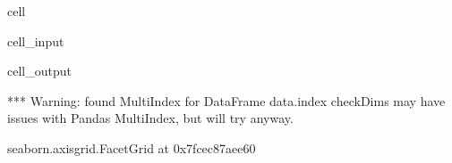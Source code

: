 \documentclass[letterpaper,table,10pt,english]{jupyterBook}
\begin{document}
\begin{sphinxuseclass}{cell}\begin{sphinxVerbatimInput}

\begin{sphinxuseclass}{cell_input}
\begin{sphinxVerbatim}[commandchars=\\\{\}]
  
     
                 
                     
\end{sphinxVerbatim}

\end{sphinxuseclass}\end{sphinxVerbatimInput}
\begin{sphinxVerbatimOutput}

\begin{sphinxuseclass}{cell_output}
\begin{sphinxVerbatim}[commandchars=\\\{\}]
*** Warning: found MultiIndex for DataFrame data.index \PYGZhy{} checkDims may have issues with Pandas MultiIndex, but will try anyway.
\end{sphinxVerbatim}

\begin{sphinxVerbatim}[commandchars=\\\{\}]
\PYGZlt{}seaborn.axisgrid.FacetGrid at 0x7fcec87aee60\PYGZgt{}
\end{sphinxVerbatim}

\noindent{}

\end{sphinxuseclass}\end{sphinxVerbatimOutput}

\end{sphinxuseclass}
\end{document}
